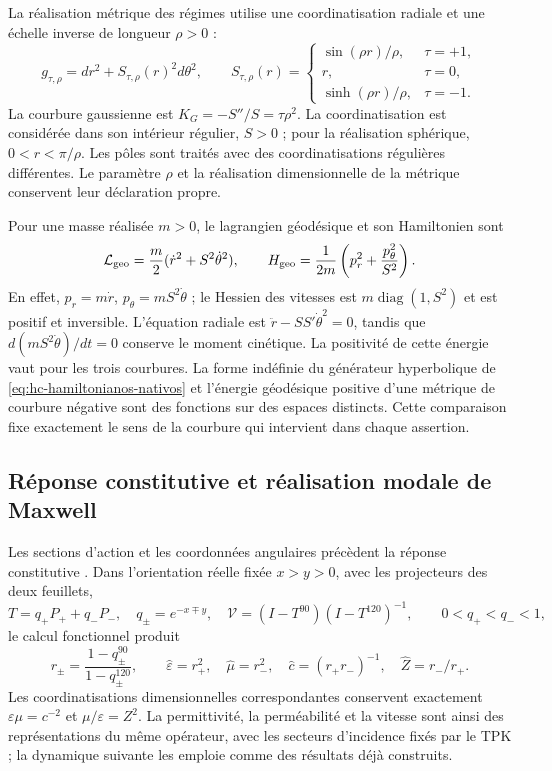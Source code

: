 La réalisation métrique des régimes utilise une coordinatisation radiale et une échelle inverse de longueur \(\rho>0\) :
\begin{equation}
 g_{\tau,\rho}=dr^2+S_{\tau,\rho}(r)^2d\theta^2,
 \qquad
 S_{\tau,\rho}(r)=
 \begin{cases}
 \sin(\rho r)/\rho,&\tau=+1,\\
 r,&\tau=0,\\
 \sinh(\rho r)/\rho,&\tau=-1.
 \end{cases}
 \label{eq:hc-metrique}
\end{equation}
La courbure gaussienne est \(K_G=-S''/S=\tau\rho^2\). La coordinatisation est considérée dans son intérieur régulier, \(S>0\) ; pour la réalisation sphérique, \(0<r<\pi/\rho\). Les pôles sont traités avec des coordinatisations régulières différentes. Le paramètre \(\rho\) et la réalisation dimensionnelle de la métrique conservent leur déclaration propre.

Pour une masse réalisée \(m>0\), le lagrangien géodésique et son
Hamiltonien sont
\begin{equation}
 \mathcal L_{\rm geo}=\frac m2(\dot r^2+S^2\dot\theta^2),\qquad
 H_{\rm geo}=\frac1{2m}\left(p_r^2+\frac{p_\theta^2}{S^2}\right).
 \label{eq:hc-geodesique}
\end{equation}
En effet, \(p_r=m\dot r\), \(p_\theta=mS^2\dot\theta\) ;
le Hessien des vitesses est \(m\operatorname{diag}(1,S^2)\)
et est positif et inversible. L’équation radiale est
\(\ddot r-SS'\dot\theta^2=0\), tandis que
\(d(mS^2\dot\theta)/dt=0\) conserve le moment cinétique.
La positivité de cette énergie vaut pour les trois courbures. La forme
indéfinie du générateur hyperbolique de \eqref{eq:hc-hamiltonianos-nativos}
et l’énergie géodésique positive d’une métrique de courbure négative
sont des fonctions sur des espaces distincts. Cette comparaison fixe exactement
le sens de la courbure qui intervient dans chaque assertion.

\subsection{Réponse constitutive et réalisation modale de Maxwell}

Les sections d’action et les coordonnées angulaires précèdent la
réponse constitutive \cite{hmtIntegral}. Dans l’orientation réelle fixée \(x>y>0\),
avec les projecteurs des deux feuillets,
\[
 T=q_+P_++q_-P_-,\quad q_\pm=e^{-x\mp y},\quad
 \mathcal V=(I-T^{90})(I-T^{120})^{-1},
 \qquad 0<q_+<q_-<1,
\]
le calcul fonctionnel produit
\[
 r_\pm=\frac{1-q_\pm^{90}}{1-q_\pm^{120}},\qquad
 \widehat\varepsilon=r_+^2,\quad \widehat\mu=r_-^2,
 \quad \widehat c=(r_+r_-)^{-1},\quad \widehat Z=r_-/r_+.
\]
Les coordinatisations dimensionnelles correspondantes conservent exactement \(\varepsilon\mu=c^{-2}\) et \(\mu/\varepsilon=Z^2\). La permittivité, la perméabilité et la vitesse sont ainsi des représentations du même opérateur, avec les secteurs d'incidence fixés par le TPK ; la dynamique suivante les emploie comme des résultats déjà construits.

